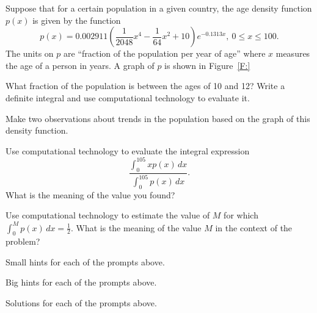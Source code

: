 \begin{activity} \label{A:6.6.1}  Suppose that for a certain population in a given country, the age density function $p(x)$ is given by the function $$p(x) = 0.002911 \left( \frac{1}{2048}x^4-\frac{1}{64}x^2+10 \right)e^{-0.1313x}, \ 0 \le x \le 100.$$
The units on $p$ are ``fraction of the population per year of age'' where $x$ measures the age of a person in years.  A graph of $p$ is shown in Figure~\ref{F:}
\ba
	\item What fraction of the population is between the ages of 10 and 12?  Write a definite integral and use computational technology to evaluate it.
	  \item Make two observations about trends in the population based on the graph of this density function.
	  \item Use computational technology to evaluate the integral expression
	  $$\frac{\int_0^{105} xp(x) \, dx}{\int_0^{105} p(x) \, dx}.$$
	  What is the meaning of the value you found?
	  \item Use computational technology to estimate the value of $M$ for which $\int_0^M p(x) \, dx = \frac{1}{2}$.  What is the meaning of the value $M$ in the context of the problem?
\ea

\end{activity}
\begin{smallhint}
\ba
	\item Small hints for each of the prompts above.
\ea
\end{smallhint}
\begin{bighint}
\ba
	\item Big hints for each of the prompts above.
\ea
\end{bighint}
\begin{activitySolution}
\ba
	\item Solutions for each of the prompts above.
\ea
\end{activitySolution}
\aftera